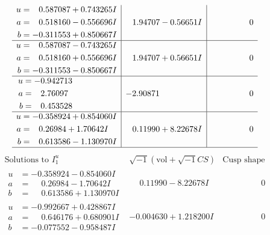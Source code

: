 \documentclass[1p]{elsarticle_modified}
\theoremstyle{definition}
\newcommand{\I}{\sqrt{-1}}
\begin{document}
$$\begin{array}{c|c|c}
\begin{aligned}
u &= \phantom{-}0.587087 + 0.743265 I \\
a &= \phantom{-}0.518160 - 0.556696 I \\
b &= -0.311553 + 0.850667 I\end{aligned}
 & \phantom{-}1.94707 - 0.56651 I & \phantom{-0.000000 } 0 \\ \hline\begin{aligned}
u &= \phantom{-}0.587087 - 0.743265 I \\
a &= \phantom{-}0.518160 + 0.556696 I \\
b &= -0.311553 - 0.850667 I\end{aligned}
 & \phantom{-}1.94707 + 0.56651 I & \phantom{-0.000000 } 0 \\ \hline\begin{aligned}
u &= -0.942713\phantom{ +0.000000I} \\
a &= \phantom{-}2.76097\phantom{ +0.000000I} \\
b &= \phantom{-}0.453528\phantom{ +0.000000I}\end{aligned}
 & -2.90871\phantom{ +0.000000I} & \phantom{-0.000000 } 0 \\ \hline\begin{aligned}
u &= -0.358924 + 0.854060 I \\
a &= \phantom{-}0.26984 + 1.70642 I \\
b &= \phantom{-}0.613586 - 1.130970 I\end{aligned}
 & \phantom{-}0.11990 + 8.22678 I & \phantom{-0.000000 } 0\\
 \hline 
 \end{array}$$\newpage$$\begin{array}{c|c|c}  
\text{Solutions to }I^u_{1}& \I (\text{vol} + \sqrt{-1}CS) & \text{Cusp shape}\\
 \hline 
\begin{aligned}
u &= -0.358924 - 0.854060 I \\
a &= \phantom{-}0.26984 - 1.70642 I \\
b &= \phantom{-}0.613586 + 1.130970 I\end{aligned}
 & \phantom{-}0.11990 - 8.22678 I & \phantom{-0.000000 } 0 \\ \hline\begin{aligned}
u &= -0.992667 + 0.428867 I \\
a &= \phantom{-}0.646176 + 0.680901 I \\
b &= -0.077552 - 0.958487 I\end{aligned}
 & -0.004630 + 1.218200 I & \phantom{-0.000000 } 0 \\ \hline\begin{aligned}

\end{aligned}
\end{array}$$
\end{document}
